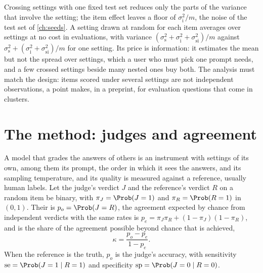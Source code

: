 \begin{refsection}
Crossing settings with one fixed test set reduces only the parts of the variance that involve the setting; the item effect leaves a floor of $\sigma_{\mathrm i}^2/m$, the noise of the test set of \cref{ch:seeds}. A setting drawn at random for each item averages over settings at no cost in evaluations, with variance $(\sigma_{\mathrm s}^2+\sigma_{\mathrm i}^2+\sigma_{\mathrm{si}}^2)/m$ against $\sigma_{\mathrm s}^2+(\sigma_{\mathrm i}^2+\sigma_{\mathrm{si}}^2)/m$ for one setting. Its price is information: it estimates the mean but not the spread over settings, which a user who must pick one prompt needs, and a few crossed settings beside many nested ones buy both. The analysis must match the design: items scored under several settings are not independent observations, a point \textcite{Miller2024} makes, in a preprint, for evaluation questions that come in clusters.

\section{The method: judges and agreement}\label{sec:instruments:judges}

A model that grades the answers of others is an instrument with settings of its own, among them its prompt, the order in which it sees the answers, and its sampling temperature, and its quality is measured against a reference, usually human labels. Let the judge's verdict $J$ and the reference's verdict $R$ on a random item be binary, with $\pi_J=\Prob(J=1)$ and $\pi_R=\Prob(R=1)$ in $(0,1)$. Their  is $p_o=\Prob(J=R)$, the agreement expected by chance from independent verdicts with the same rates is $p_e=\pi_J\pi_R+(1-\pi_J)(1-\pi_R)$, and  \parencite{Cohen1960} is the share of the agreement possible beyond chance that is achieved,
\[
\kappa=\frac{p_o-p_e}{1-p_e}.
\]
When the reference is the truth, $p_o$ is the judge's accuracy, with sensitivity $\mathrm{se}=\Prob(J=1\mid R=1)$ and specificity $\mathrm{sp}=\Prob(J=0\mid R=0)$.


\end{refsection}
